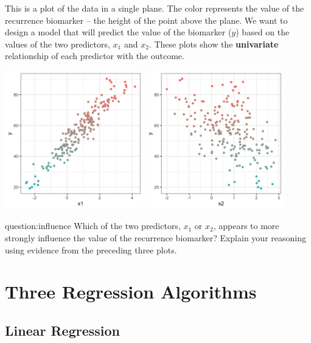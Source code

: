 This is a plot of the data in a single plane. The color represents the value of the recurrence biomarker -- the height of the point above the plane. We want to design a model that will predict the value of the biomarker ($y$) based on the values of the two predictors, $x_1$ and $x_2$. These plots show the \textbf{univariate} relationship of each predictor with the outcome.
\begin{center}
\includegraphics[width=0.45\textwidth]{img/esl-reg-x1.png}
\includegraphics[width=0.45\textwidth]{img/esl-reg-x2.png}
\end{center}

\begin{question}{question:influence}
Which of the two predictors, $x_1$ or $x_2$, appears to more strongly influence the value of the recurrence biomarker? Explain your reasoning using evidence from the preceding three plots. 
\end{question}


\section{Three Regression Algorithms}

\subsection{Linear Regression \label{ssect:linreg}}

